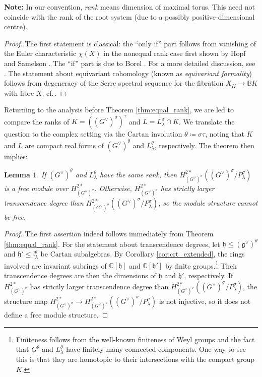 \documentclass{amsart}
\newcommand{\cf}{cf.\,}
\newcommand{\C}{\mathbb{C}}
\newcommand{\g}{\mathfrak{g}}
\newcommand{\h}{\mathfrak{h}}
\newcommand{\el}{\mathfrak{l}}
\theoremstyle{definition}
\theoremstyle{plain}
\newtheorem{lem}[defn]{Lemma}
\theoremstyle{remark}
\begin{document}
\noindent
\textbf{Note:} In our convention, \emph{rank} means dimension of maximal torus. This need not coincide with the rank of the root system (due to a possibly positive-dimensional centre).
\begin{proof}
    The first statement is classical: the ``only if'' part follows from vanishing of the Euler characteristic $\chi(X)$ in the nonequal rank case first shown by Hopf and Samelson \cite{HopfSamelson1941}. The ``if'' part is due to Borel \cite{Borel1953_esp_fib_et_hom}. For a more detailed discussion, see \cite[ch.\,5]{Carlson_thesis}. The statement about equivariant cohomology (known as \emph{equivariant formality}) follows from degeneracy of the Serre spectral sequence for the fibration $X_K\to \mathbb{B}K$ with fibre $X$, \cf \cite[ch.\,9]{Carlson_thesis}.
\end{proof}
Returning to the analysis before Theorem \ref{thm:equal_rank}, we are led to compare the ranks of $K=((G^\vee)^\sigma)^\tau$ and $L=L_\lambda^\sigma\cap K$. We translate the question to the complex setting via the Cartan involution $\theta\coloneqq \sigma \tau$, noting that $K$ and $L$ are compact real forms of $(G^\vee)^\theta$ and $L_\lambda^\theta$, respectively. The theorem then implies:
\begin{lem}
\label{lem:eq_rank_is_good}
    If $(G^\vee)^\theta$ and $L_\lambda^\theta$ have the same rank, then 
    $
        H^{2*}_{(G^\vee)^{\sigma}}((G^\vee)^\sigma/P_\lambda^\sigma)
    $
     is a free module over $H^{2*}_{(G^\vee)^{\sigma}}$. Otherwise, $H^{2*}_{(G^\vee)^{\sigma}}$ has strictly larger transcendence degree than $H^{2*}_{(G^\vee)^{\sigma}}((G^\vee)^\sigma/P_\lambda^\sigma)$, so the module structure cannot be free.
\end{lem}
\begin{proof}
    The first assertion indeed follows immediately from Theorem \ref{thm:equal_rank}. For the statement about transcendence degrees, let $\h\le (\g^\vee)^\theta$ and $\h'\le \el_\lambda^\theta$ be Cartan subalgebras. By Corollary \ref{cor:crt_extended}, the rings involved are invariant subrings of $\C[\h]$ and $\C[\h']$ by finite groups.\footnote{Finiteness follows from the well-known finiteness of Weyl groups and the fact that $G^\theta$ and $L_\lambda^\theta$ have finitely many connected components. One way to see this is that they are homotopic to their intersections with the compact group $K$.} Their transcendence degrees are then the dimensions of $\h$ and $\h'$, respectively. If $H^{2*}_{(G^\vee)^{\sigma}}$ has strictly larger transcendence degree than $H^{2*}_{(G^\vee)^{\sigma}}((G^\vee)^\sigma/P_\lambda^\sigma)$, the structure map $H^{2*}_{(G^\vee)^{\sigma}} \to H^{2*}_{(G^\vee)^{\sigma}}((G^\vee)^\sigma/P_\lambda^\sigma)$ is not injective, so it does not define a free module structure.
\end{proof}
\end{document}
